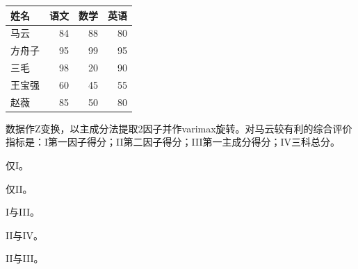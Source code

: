 \par\addvspace{6pt}\noindent\begin{minipage}{\linewidth}


\begin{center}\small\setlength{\tabcolsep}{4pt}\renewcommand{\arraystretch}{1.18}\begin{tabular}{@{}lrrr@{}}
\toprule
姓名 & 语文 & 数学 & 英语 \\
\midrule

马云 & 84 & 88 & 80 \\
方舟子 & 95 & 99 & 95 \\
三毛 & 98 & 20 & 90 \\
王宝强 & 60 & 45 & 55 \\
赵薇 & 85 & 50 & 80 \\
\bottomrule\end{tabular}\end{center}

数据作Z变换，以主成分法提取2因子并作varimax旋转。对马云较有利的综合评价指标是：I第一因子得分；II第二因子得分；III第一主成分得分；IV三科总分。


\begin{choices}

\item 仅I。

\item 仅II。

\item I与III。

\item II与IV。

\item II与III。

\end{choices}

\end{minipage}\par\vspace{4pt}

